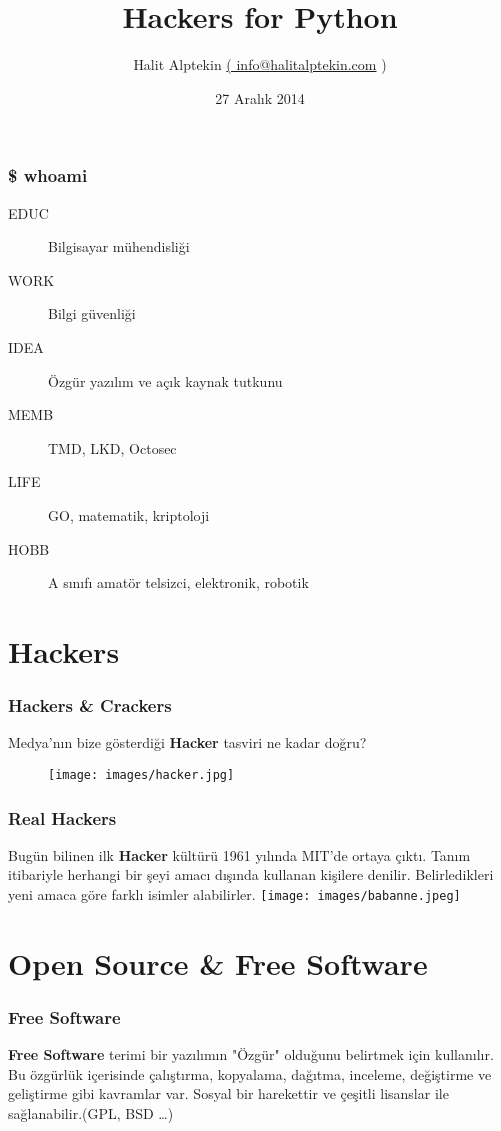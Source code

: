 \documentclass[10pt, compress]{beamer}
\title{Hackers for Python}
\subtitle{}
\date{27 Aralık 2014}
\author{Halit Alptekin \href{mailto:info@halitalptekin.com}{( info@halitalptekin.com} )}
\institute{Süleyman Demirel Üniversitesi Yazılım Klübü}
\begin{document}
\maketitle

\begin{frame}[fragile]
    \frametitle{\$ whoami}
    \begin{description}
        \item[EDUC] Bilgisayar mühendisliği
        \item[WORK] Bilgi güvenliği
        \item[IDEA] Özgür yazılım ve açık kaynak tutkunu
        \item[MEMB] TMD, LKD, Octosec
        \item[LIFE] GO, matematik, kriptoloji
        \item[HOBB] A sınıfı amatör telsizci, elektronik, robotik
    \end{description}
\end{frame}

\section{Hackers}

\begin{frame}[fragile]
    \frametitle{Hackers \& Crackers}
    Medya'nın bize gösterdiği \textbf{Hacker} tasviri ne kadar doğru?
    \begin{figure}[H]
        \texttt{[image: images/hacker.jpg]}
   \end{figure}
\end{frame}

\begin{frame}[fragile]
    \frametitle{Real Hackers}
    Bugün bilinen ilk \textbf{Hacker} kültürü 1961 yılında MIT'de ortaya çıktı. Tanım itibariyle herhangi bir şeyi amacı dışında kullanan kişilere denilir. Belirledikleri yeni amaca göre farklı isimler alabilirler.
    \newline
    \newline
    \texttt{[image: images/babanne.jpeg]}
\end{frame}

\section{Open Source \& Free Software}

\begin{frame}[fragile]
    \frametitle{Free Software}
    \textbf{Free Software} terimi bir yazılımın "Özgür" olduğunu belirtmek için kullanılır. Bu özgürlük içerisinde çalıştırma, kopyalama, dağıtma, inceleme, değiştirme ve geliştirme gibi kavramlar var.
    \newline
    \newline
    Sosyal bir harekettir ve çeşitli lisanslar ile sağlanabilir.(GPL, BSD \ldots)
\end{frame}
\end{document}
